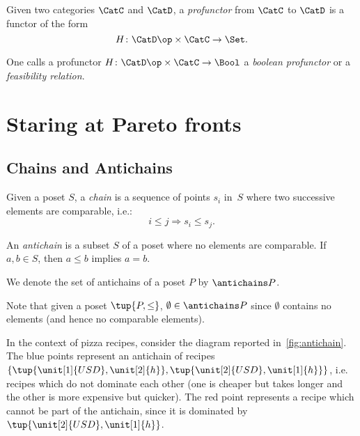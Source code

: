 \begin{shaded}
\begin{definition}[Profunctor]
\label{def:profunctor}
Given two categories $\CatC$ and $\CatD$, a \emph{profunctor} from $\CatC$ to $\CatD$ is a functor of the form
\begin{equation}
    H\colon \CatD\op \times \CatC \to \Set.
\end{equation}
\end{definition}
\begin{remark}
One calls a profunctor $H\colon \CatD\op \times \CatC \to \Bool$ a \emph{boolean profunctor} or a \emph{feasibility relation}.
\end{remark}
\end{shaded}




\clearpage
\section{Staring at Pareto fronts}

\subsection{Chains and Antichains} \label{sec:chains-antichains}


\begin{definition}
\label{def:chain}
Given a poset $S$, a \emph{chain} is a sequence of points ${s_i}$ in~$S$ where two successive elements are comparable, i.e.:
\begin{equation}
    i \leq j \Rightarrow s_i \leq s_j.
\end{equation}
\end{definition}

 
\begin{definition}
\label{def:antichain}
An \emph{antichain} is a subset $S$ of a poset where no elements are comparable. If $a,b \in S$, then $a \leq b$ implies $a=b$.
\end{definition}
\begin{remark}
We denote the set of antichains of a poset $P$ by $\antichains P$.
\end{remark}
\begin{remark}
Note that given a poset $\tup{P,\leq}$, $\emptyset \in \antichains P$ since $\emptyset$ contains no elements (and hence no comparable elements).
\end{remark}

In the context of pizza recipes, consider the diagram reported in~\cref{fig:antichain}. The blue points represent an antichain of recipes $\{\tup{\unit[1]{USD},\unit[2]{h}},\tup{\unit[2]{USD},\unit[1]{h}}\}$, i.e. recipes which do not dominate each other (one is cheaper but takes longer and the other is more expensive but quicker). The red point represents a recipe which cannot be part of the antichain, since it is dominated by $\tup{\unit[2]{USD},\unit[1]{h}}$. 


